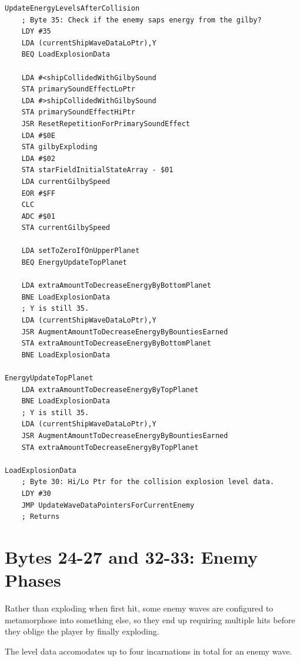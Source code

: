 \begin{lstlisting}
UpdateEnergyLevelsAfterCollision
    ; Byte 35: Check if the enemy saps energy from the gilby?
    LDY #35
    LDA (currentShipWaveDataLoPtr),Y
    BEQ LoadExplosionData

    LDA #<shipCollidedWithGilbySound
    STA primarySoundEffectLoPtr
    LDA #>shipCollidedWithGilbySound
    STA primarySoundEffectHiPtr
    JSR ResetRepetitionForPrimarySoundEffect
    LDA #$0E
    STA gilbyExploding
    LDA #$02
    STA starFieldInitialStateArray - $01
    LDA currentGilbySpeed
    EOR #$FF
    CLC
    ADC #$01
    STA currentGilbySpeed

    LDA setToZeroIfOnUpperPlanet
    BEQ EnergyUpdateTopPlanet

    LDA extraAmountToDecreaseEnergyByBottomPlanet
    BNE LoadExplosionData
    ; Y is still 35.
    LDA (currentShipWaveDataLoPtr),Y
    JSR AugmentAmountToDecreaseEnergyByBountiesEarned
    STA extraAmountToDecreaseEnergyByBottomPlanet
    BNE LoadExplosionData

EnergyUpdateTopPlanet   
    LDA extraAmountToDecreaseEnergyByTopPlanet
    BNE LoadExplosionData
    ; Y is still 35.
    LDA (currentShipWaveDataLoPtr),Y
    JSR AugmentAmountToDecreaseEnergyByBountiesEarned
    STA extraAmountToDecreaseEnergyByTopPlanet

LoadExplosionData
    ; Byte 30: Hi/Lo Ptr for the collision explosion level data.
    LDY #30
    JMP UpdateWaveDataPointersForCurrentEnemy
    ; Returns
\end{lstlisting}

\section{Bytes 24-27 and 32-33: Enemy Phases}
Rather than exploding when first hit, some enemy waves are configured to metamorphose into something else, so they 
end up requiring multiple hits before they oblige the player by finally exploding.

The level data accomodates up to four incarnations in total for an enemy wave.

